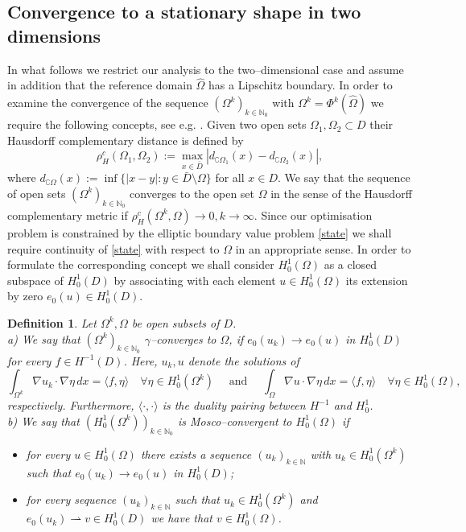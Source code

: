 \documentclass[a4paper,10pt]{article}
\newcommand{\dx}{\,dx}
\newcommand{\Omref}{\hat \Omega}
\theoremstyle{plain}
\theoremstyle{plain}
\newtheorem{defn}{Definition}[section]
\numberwithin{equation}{section}
\begin{document}
\noindent
\subsection{Convergence to a stationary shape in two dimensions}

In what follows we restrict our analysis to the two--dimensional case and assume in addition that
the reference domain $\Omref$ has a Lipschitz boundary. 
In order to examine the convergence of the sequence $(\Omega^k)_{k \in \mathbb N_0}$ with
$\Omega^k=\Phi^k(\Omref)$ we require the following concepts, see
e.g. \cite{HenMic06}. 
Given two open sets  $\Omega_1, \Omega_2 \subset D$ their Hausdorff complementary distance 
is defined by
\begin{displaymath}
\rho_H^c(\Omega_1,\Omega_2):= \max_{x \in \bar D} | d_{\complement \Omega_1}(x) - d_{\complement \Omega_2}(x) |,
\end{displaymath}
where $d_{\complement \Omega}(x):= \inf\{|x-y| : y \in \bar D \setminus \Omega\}$ for all $x \in D$. 
We say that the sequence of open sets $(\Omega^k)_{k \in \mathbb N_0}$  converges to the open set $\Omega$ in the sense of the Hausdorff complementary metric if $\rho_H^c(\Omega^k,\Omega) \rightarrow 0,
k \rightarrow \infty$. Since our optimisation problem is constrained by the elliptic boundary value problem \eqref{state} we shall require   continuity of \eqref{state} with respect to $\Omega$ in an appropriate sense. In order to formulate the corresponding concept  we shall consider
$H^1_0(\Omega)$ as a closed subspace of $H^1_0(D)$ by associating with each element $u \in H^1_0(\Omega)$ its extension by zero $e_0(u) \in H^1_0(D)$. 

\begin{defn} Let $\Omega^k, \Omega$ be open subsets of $D$. \\
a) We say that  $(\Omega^k)_{k \in \mathbb N_0}$ $\gamma$--converges to $\Omega$, if $e_0(u_k) \rightarrow e_0(u)$
in $H^1_0(D)$ for every $f \in H^{-1}(D)$. Here, $u_k,u$ denote the solutions of
\[\int_{\Omega^k}\nabla u_k \cdot \nabla \eta \dx = \langle f,\eta\rangle \quad  \forall \eta \in H^1_0(\Omega^k) \quad \text{ and } \quad \int_{\Omega}\nabla u \cdot \nabla \eta \dx = \langle f,\eta\rangle \quad  \forall \eta \in H^1_0(\Omega), \,\]respectively. Furthermore,  $\langle \cdot, \cdot \rangle$ is  the duality pairing between $H^{-1}$ and $H^1_0$. \\[2mm]
b) We say that $(H^1_0(\Omega^k))_{k \in \mathbb N_0}$ is Mosco--convergent to $H^1_0(\Omega)$ if 
\begin{itemize}
\item for every $u \in H^1_0(\Omega)$ there exists a sequence $(u_k)_{k \in \mathbb N}$ with $u_k\in H^1_0(\Omega^k)$ such that $e_0(u_k) \rightarrow e_0(u)$ in $H^1_0(D)$;
\item for every sequence $(u_k)_{k \in \mathbb N}$ such that $u_k \in  H^1_0(\Omega^k)$ and $e_0(u_k)\rightharpoonup v \in H^1_0(D)$ we have that $v\in H^1_0(\Omega)$.
\end{itemize}
\end{defn}
\end{document}
